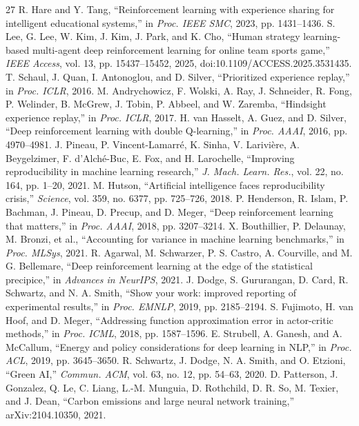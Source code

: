 \documentclass[conference,9pt]{IEEEtran}
\begin{document}
\begin{thebibliography}{27}
 R. Hare and Y. Tang, ``Reinforcement learning with experience sharing for intelligent educational systems,'' in \textit{Proc. IEEE SMC}, 2023, pp. 1431--1436.
 S. Lee, G. Lee, W. Kim, J. Kim, J. Park, and K. Cho, ``Human strategy learning-based multi-agent deep reinforcement learning for online team sports game,'' \textit{IEEE Access}, vol. 13, pp. 15437--15452, 2025, doi:10.1109/ACCESS.2025.3531435.
 T. Schaul, J. Quan, I. Antonoglou, and D. Silver, ``Prioritized experience replay,'' in \textit{Proc. ICLR}, 2016.
 M. Andrychowicz, F. Wolski, A. Ray, J. Schneider, R. Fong, P. Welinder, B. McGrew, J. Tobin, P. Abbeel, and W. Zaremba, ``Hindsight experience replay,'' in \textit{Proc. ICLR}, 2017.
 H. van Hasselt, A. Guez, and D. Silver, ``Deep reinforcement learning with double Q-learning,'' in \textit{Proc. AAAI}, 2016, pp. 4970--4981.
 J. Pineau, P. Vincent-Lamarr\'e, K. Sinha, V. Larivi\`ere, A. Beygelzimer, F. d'Alch\'e-Buc, E. Fox, and H. Larochelle, ``Improving reproducibility in machine learning research,'' \textit{J. Mach. Learn. Res.}, vol. 22, no. 164, pp. 1--20, 2021.
 M. Hutson, ``Artificial intelligence faces reproducibility crisis,'' \textit{Science}, vol. 359, no. 6377, pp. 725--726, 2018.
 P. Henderson, R. Islam, P. Bachman, J. Pineau, D. Precup, and D. Meger, ``Deep reinforcement learning that matters,'' in \textit{Proc. AAAI}, 2018, pp. 3207--3214.
 X. Bouthillier, P. Delaunay, M. Bronzi, et al., ``Accounting for variance in machine learning benchmarks,'' in \textit{Proc. MLSys}, 2021.
 R. Agarwal, M. Schwarzer, P. S. Castro, A. Courville, and M. G. Bellemare, ``Deep reinforcement learning at the edge of the statistical precipice,'' in \textit{Advances in NeurIPS}, 2021.
 J. Dodge, S. Gururangan, D. Card, R. Schwartz, and N. A. Smith, ``Show your work: improved reporting of experimental results,'' in \textit{Proc. EMNLP}, 2019, pp. 2185--2194.
 S. Fujimoto, H. van Hoof, and D. Meger, ``Addressing function approximation error in actor-critic methods,'' in \textit{Proc. ICML}, 2018, pp. 1587--1596.
 E. Strubell, A. Ganesh, and A. McCallum, ``Energy and policy considerations for deep learning in NLP,'' in \textit{Proc. ACL}, 2019, pp. 3645--3650.
 R. Schwartz, J. Dodge, N. A. Smith, and O. Etzioni, ``Green AI,'' \textit{Commun. ACM}, vol. 63, no. 12, pp. 54--63, 2020.
 D. Patterson, J. Gonzalez, Q. Le, C. Liang, L.-M. Munguia, D. Rothchild, D. R. So, M. Texier, and J. Dean, ``Carbon emissions and large neural network training,'' arXiv:2104.10350, 2021.
\end{thebibliography}

\balance
\end{document}
